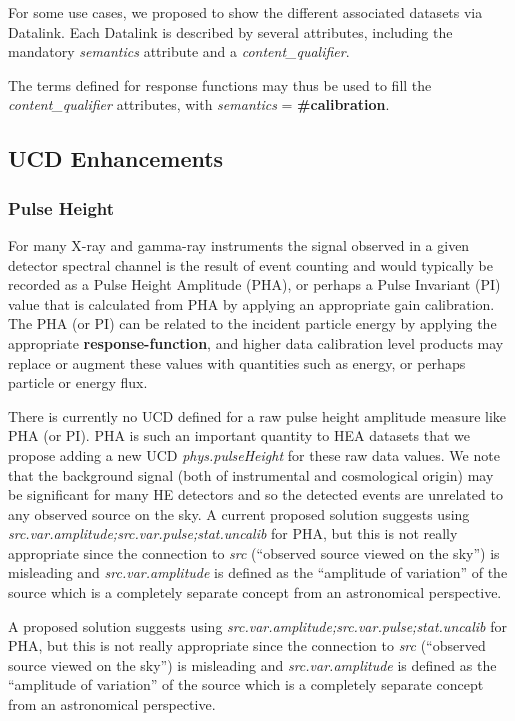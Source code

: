 \documentclass[11pt,a4paper]{ivoa}
\begin{document}
For some use cases, we proposed to show the different associated datasets via Datalink. Each Datalink is described by several attributes, including the mandatory {\em semantics} attribute and a {\em content\_qualifier}.

The terms defined for response functions may thus be used to fill the {\em content\_qualifier} attributes, with {\em semantics} = {\bf \#calibration}.


\subsection{UCD Enhancements}\label{sec:UCDs}

\subsubsection{Pulse Height}

For many X-ray and gamma-ray instruments the signal observed in a given detector spectral channel is the result of event counting and would typically be recorded as a Pulse Height Amplitude (PHA), or perhaps a Pulse Invariant (PI) value that is calculated from PHA by applying an appropriate gain calibration.  The PHA (or PI) can be related to the incident particle energy by applying the appropriate {\bf response-function}, and higher data calibration level products may replace or augment these values with quantities such as energy, or perhaps particle or energy flux.

There is currently no UCD defined for a raw pulse height amplitude measure like PHA (or PI). PHA is such an important quantity to \gls{HEA} datasets that we propose adding a new UCD {\em phys.pulseHeight\/} for these raw data values.  We note that the background signal (both of instrumental and cosmological origin) may be significant for many \gls{HE} detectors and so the detected events are unrelated to any observed source on the sky.  A current proposed solution suggests using {\em src.var.amplitude;src.var.pulse;stat.uncalib\/} for PHA, but this is not really appropriate since the connection to {\em src\/} (``observed source viewed on the sky'') is misleading and {\em src.var.amplitude\/} is defined as the ``amplitude of variation'' of the source which is a completely separate concept from an astronomical perspective.

A proposed solution suggests using {\em src.var.amplitude;src.var.pulse;stat.uncalib\/} for PHA, but this is not really appropriate since the connection to {\em src\/} (``observed source viewed on the sky'') is misleading and {\em src.var.amplitude\/} is defined as the ``amplitude of variation'' of the source which is a completely separate concept from an astronomical perspective.
\end{document}
